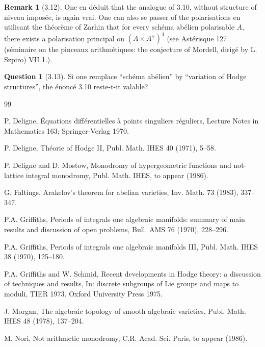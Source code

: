 \documentclass[12pt,a4paper]{article}
\theoremstyle{plain}
\theoremstyle{definition}
\newtheorem{remark}{Remark}[section]
\newtheorem{question}{Question}[section]
\newcommand{\dual}{\vee}
\begin{document}
{\begin{remark}[3.12]
One en d\'{e}duit that the analogue of 3.10, without structure of niveau impos\'{e}e, is again vrai. One can also se passer of the polarisations en utilisant the th\'{e}or\`{e}me of Zarhin that for every sch\'{e}ma ab\'{e}lien polarisable $A$, there exists a polarisation principal on $(A \times A^{\dual})^{4}$ (see Ast\'{e}risque 127 (s\'{e}minaire on the pinceaux arithm\'{e}tiques: the conjecture of Mordell, dirig\'{e} by L. Szpiro) VII 1.).
\end{remark}

\begin{question}[3.13]
Si one remplace ``sch\'{e}ma ab\'{e}lien'' by ``variation of Hodge structures'', the \'{e}nonc\'{e} 3.10 reste-t-it valable?
\end{question}

\begin{thebibliography}{99}

 P. Deligne, \'{E}quations diff\'{e}rentielles \`{a} points singuliers r\'{e}guliers, Lecture Notes in Mathematics 163; Springer-Verlag 1970.

 P. Deligne, Th\'{e}orie of Hodge II, Publ. Math. IHES 40 (1971), 5--58.

 P. Deligne and D. Mostow, Monodromy of hypergeometric functions and not-lattice integral monodromy, Publ. Math. IHES, to appear (1986).

 G. Faltings, Arakelov's theorem for abelian varieties, Inv. Math. 73 (1983), 337--347.

 P.A. Griffiths, Periods of integrals one algebraic manifolds: summary of main results and discussion of open problems, Bull. AMS 76 (1970), 228--296.

 P.A. Griffiths, Periods of integrals one algebraic manifolds III, Publ. Math. IHES 38 (1970), 125--180.

 P.A. Griffiths and W. Schmid, Recent developments in Hodge theory: a discussion of techniques and results, In: discrete subgroups of Lie groups and maps to moduli, TIER 1973. Oxford University Press 1975.

 J. Morgan, The algebraic topology of smooth algebraic varieties, Publ. Math. IHES 48 (1978), 137--204.

 M. Nori, Not arithmetic monodromy, C.R. Acad. Sci. Paris, to appear (1986).


\end{thebibliography}}
\end{document}
